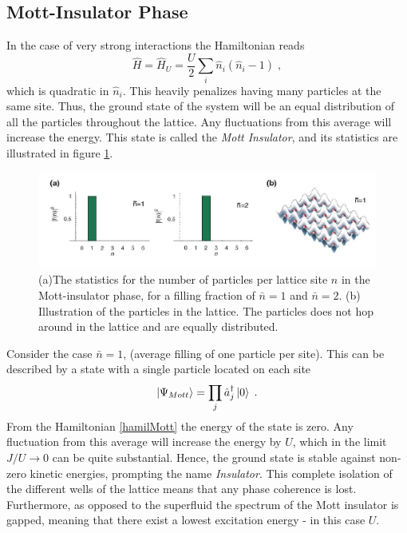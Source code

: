\subsection{Mott-Insulator Phase}
In the case of very strong interactions the Hamiltonian reads
\begin{equation}
	\hat{H} = \hat{H}_U = \frac{U}{2} \sum_{i} \hat{n}_i \left( \hat{n}_i -1 \right) \; ,
	\label{hamilMott}
\end{equation}
which is quadratic in $\hat{n}_i$. This heavily penalizes having many particles at the same site. Thus, the ground state of the system will be an equal distribution of all the particles throughout the lattice. Any fluctuations from this average will increase the energy. This state is called the \textit{Mott Insulator}, and its statistics are illustrated in figure \ref{fig:f(n)_M}.\\
\begin{figure}[!h]
\centering
\includegraphics[width=0.8\columnwidth]{Figures/f(n)_M.JPG} 
\caption{(a)The statistics for the number of particles per lattice site $n$ in the Mott-insulator phase, for a filling fraction of $\bar{n}=1$ and $\bar{n}=2$. (b) Illustration of the particles in the lattice. The particles does not hop around in the lattice and are equally distributed. \cite{greiner}}
\label{fig:f(n)_M} 
\end{figure} 

Consider the case $\bar{n} = 1$, (average filling of one particle per site). This can be described by a state with a single particle located on each site \cite{manybodyBloch}
\begin{equation}
	\ket{\Psi_{Mott}} = \prod_j \hat{a}_{j}^{\dag} \ket{0} \; .
\end{equation}
From the Hamiltonian \ref{hamilMott} the energy of the state is zero. Any fluctuation from this average will increase the energy by $U$, which in the limit $J/U \rightarrow 0$ can be quite substantial. Hence, the ground state is stable against non-zero kinetic energies, prompting the name \textit{Insulator}. This complete isolation of the different wells of the lattice means that any phase coherence is lost. Furthermore, as opposed to the superfluid the spectrum of the Mott insulator is gapped, meaning that there exist a lowest excitation energy - in this case $U$.


